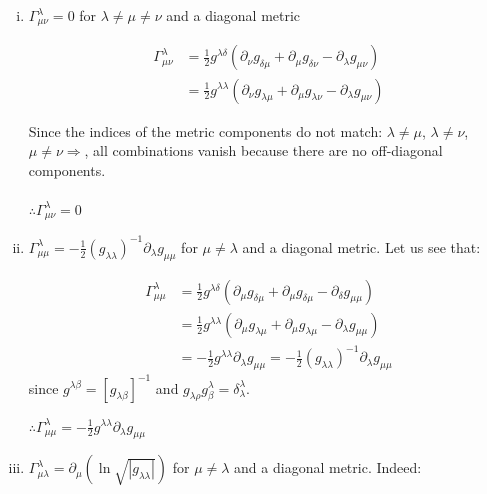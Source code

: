 \documentclass[12pt]{report}
\begin{document}
	\begin{enumerate}[(i)]
		
		\item $\Gamma^\lambda_{\mu\nu} = 0$ for $\lambda \neq \mu \neq \nu$ and a diagonal metric
		
		\begin{align}
			\Gamma^\lambda_{\mu\nu} &= \frac{1}{2} g^{\lambda\delta} (\partial_\nu g_{\delta\mu} + \partial_\mu g_{\delta\nu} - \partial_\lambda g_{\mu\nu}) \\
			&= \frac{1}{2} g^{\lambda\lambda} (\partial_\nu g_{\lambda\mu} + \partial_\mu g_{\lambda\nu} - \partial_\lambda g_{\mu\nu})
		\end{align}
		
		Since the indices of the metric components do not match:
		$\lambda \neq \mu$, $\lambda \neq \nu$, $\mu \neq \nu \Rightarrow$, all combinations vanish because there are no off-diagonal components.\\\\
		$\therefore \boxed{\Gamma^\lambda_{\mu\nu} = 0}$
		
		\item $\Gamma^\lambda_{\mu\mu} = -\frac{1}{2}(g_{\lambda\lambda})^{-1}\partial_\lambda g_{\mu\mu}$ for $\mu\neq\lambda$ and a diagonal metric. Let us see that:
		
		\begin{align*}
			\Gamma^\lambda_{\mu\mu} &= \frac{1}{2}g^{\lambda\delta}(\partial_\mu g_{\delta\mu} + \partial_\mu g_{\delta\mu} - \partial_\delta g_{\mu\mu}) \\
			&= \frac{1}{2} g^{\lambda\lambda} (\partial_\mu g_{\lambda\mu} + \partial_\mu g_{\lambda\mu} - \partial_\lambda g_{\mu\mu}) \\
			&= -\frac{1}{2} g^{\lambda\lambda} \partial_\lambda g_{\mu\mu} = -\frac{1}{2} (g_{\lambda\lambda})^{-1} \partial_\lambda g_{\mu\mu} 
		\end{align*}
		since $g^{\lambda\beta} = [g_{\lambda\beta}]^{-1}$ and $g_{\lambda\rho} g_\beta^\lambda = \delta_\lambda^\lambda$.
		
		$\therefore \boxed{\Gamma_{\mu\mu}^\lambda = -\frac{1}{2} g^{\lambda\lambda} \partial_\lambda g_{\mu\mu}}$
		
		\item $\Gamma_{\mu\lambda}^\lambda = \partial_\mu(\ln\sqrt{|g_{\lambda\lambda}|})$ \quad for $\mu\neq\lambda$ and a diagonal metric. Indeed:
		

\end{enumerate}
\end{document}
